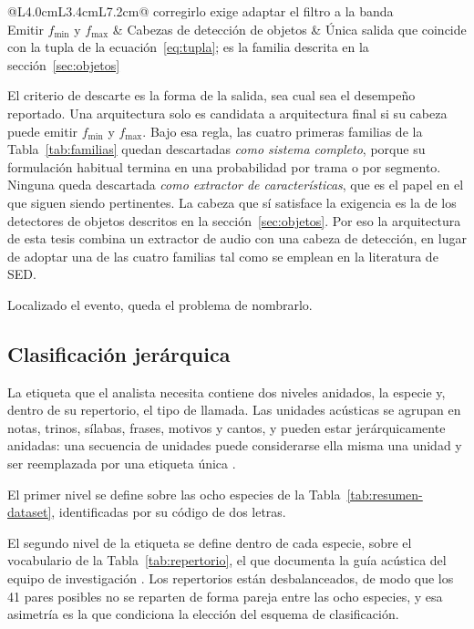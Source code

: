 \begin{table}[htbp]
\begin{tabular}{@{}L{4.0cm}L{3.4cm}L{7.2cm}@{}}
        corregirlo exige adaptar el filtro a la banda \citep{nam_frequency_2022}                                               \\
        \addlinespace
        Emitir $f_{\min}$ y $f_{\max}$                         &
        Cabezas de detección de objetos                        &
        Única salida que coincide con la tupla de la ecuación~\eqref{eq:tupla};
        es la familia descrita en la sección~\ref{sec:objetos}                                                                 \\
        \bottomrule
    \end{tabular}
\end{table}

El criterio de descarte es la forma de la salida, sea cual sea el desempeño
reportado. Una arquitectura solo es candidata a arquitectura final si su cabeza
puede emitir $f_{\min}$ y $f_{\max}$. Bajo esa regla, las cuatro primeras familias
de la Tabla~\ref{tab:familias} quedan descartadas \emph{como sistema completo},
porque su formulación habitual termina en una probabilidad por trama o por
segmento. Ninguna queda descartada \emph{como extractor de características}, que
es el papel en el que siguen siendo pertinentes. La cabeza que sí satisface la
exigencia es la de los detectores de objetos descritos en la
sección~\ref{sec:objetos}. Por eso la arquitectura de esta tesis combina un
extractor de audio con una cabeza de detección, en lugar de adoptar una de las
cuatro familias tal como se emplean en la literatura de SED.

Localizado el evento, queda el problema de nombrarlo.

\subsection{Clasificación jerárquica}
\label{sec:etiqueta}

La etiqueta que el analista necesita contiene dos niveles anidados,
la especie y, dentro de su repertorio, el tipo de llamada. Las unidades acústicas se agrupan en notas,
trinos, sílabas, frases, motivos y cantos, y pueden estar jerárquicamente anidadas:
una secuencia de unidades puede considerarse ella misma una unidad y ser reemplazada por una
etiqueta única \citep{kershenbaum_acoustic_2016}.

El primer nivel se define sobre las ocho especies de la
Tabla~\ref{tab:resumen-dataset}, identificadas por su código de dos letras.

El segundo nivel de la etiqueta se define dentro de cada especie, sobre el
vocabulario de la Tabla~\ref{tab:repertorio}, el que documenta la guía acústica
del equipo de investigación \citep{proyecto8_guia_2025}. Los repertorios están desbalanceados, de modo que los 41
pares posibles no se reparten de forma pareja entre las ocho especies, y esa
asimetría es la que condiciona la elección del esquema de clasificación.

